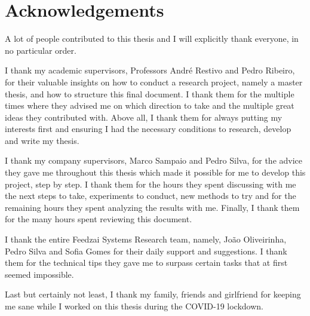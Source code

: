 \chapter*{Acknowledgements}

A lot of people contributed to this thesis and I will explicitly thank everyone, in no particular order.

I thank my academic supervisors, Professors André Restivo and Pedro Ribeiro, for their valuable insights on how to conduct a research project, namely a master thesis, and how to structure this final document. I thank them for the multiple times where they advised me on which direction to take and the multiple great ideas they contributed with. Above all, I thank them for always putting my interests first and ensuring I had the necessary conditions to research, develop and write my thesis.

I thank my company supervisors, Marco Sampaio and Pedro Silva, for the advice they gave me throughout this thesis which made it possible for me to develop this project, step by step. I thank them for the hours they spent discussing with me the next steps to take, experiments to conduct, new methods to try and for the remaining hours they spent analyzing the results with me. Finally, I thank them for the many hours spent reviewing this document.

I thank the entire Feedzai Systems Research team, namely, João Oliveirinha, Pedro Silva and Sofia Gomes for their daily support and suggestions. I thank them for the technical tips they gave me to surpass certain tasks that at first seemed impossible. 

Last but certainly not least, I thank my family, friends and girlfriend for keeping me sane while I worked on this thesis during the COVID-19 lockdown.

\vspace{10mm}
